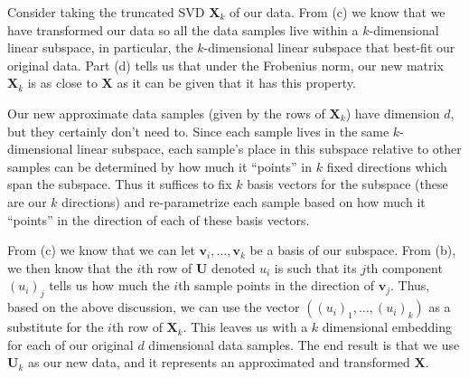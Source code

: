 Consider taking the truncated SVD $\textbf{X}_k$ of our data. From (c) we know that we have transformed our data so all the data samples live within a $k$-dimensional linear subspace, in particular, the $k$-dimensional linear subspace that best-fit our original data. Part (d) tells us that under the Frobenius norm, our new matrix $\textbf{X}_k$ is as close to $\textbf{X}$ as it can be given that it has this property. \newline

Our new approximate data samples (given by the rows of $\textbf{X}_k$) have dimension $d$, but they certainly don't need to. Since each sample lives in the same $k$-dimensional linear subspace, each sample's place in this subspace relative to other samples can be determined by how much it ``points'' in $k$ fixed directions which span the subspace. Thus it suffices to fix $k$ basis vectors for the subspace (these are our $k$ directions) and re-parametrize each sample based on how much it ``points'' in the direction of each of these basis vectors. \newline 

From (c) we know that we can let $\textbf{v}_i, \dots,\textbf{v}_k$ be a basis of our subspace. From (b), we then know that the $i$th row of $\textbf{U}$ denoted $u_i$ is such that its $j$th component $(u_i)_{j}$ tells us how much the $i$th sample points in the direction of $\textbf{v}_j$. Thus, based on the above discussion, we can use the vector $((u_i)_1, \dots, (u_{i})_k)$ as a substitute for the $i$th row of $\textbf{X}_k$. This leaves us with a $k$ dimensional embedding for each of our original $d$ dimensional data samples. The end result is that we use $\textbf{U}_k$ as our new data, and it represents an approximated and transformed $\textbf{X}$.